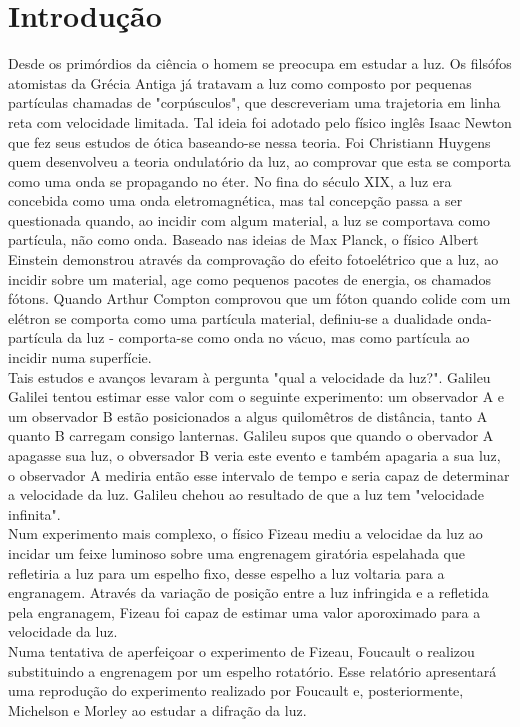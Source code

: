\section{Introdução}
Desde os primórdios da ciência o homem se preocupa em estudar a luz. Os filsófos atomistas da Grécia Antiga já tratavam a luz como composto por pequenas partículas chamadas de "corpúsculos", que descreveriam uma trajetoria em linha reta com velocidade limitada. Tal ideia foi adotado pelo físico inglês Isaac Newton que fez seus estudos de ótica baseando-se nessa teoria. Foi Christiann Huygens quem desenvolveu a teoria ondulatório da luz, ao comprovar que esta se comporta como uma onda se propagando no éter. No fina do século XIX, a luz era concebida como uma onda eletromagnética, mas tal concepção passa a ser questionada quando, ao incidir com algum material, a luz se comportava como partícula, não como onda. Baseado nas ideias de Max Planck, o físico Albert Einstein demonstrou através da comprovação do efeito fotoelétrico que a luz, ao incidir sobre um material, age como pequenos pacotes de energia, os chamados fótons. Quando Arthur Compton comprovou que um fóton quando colide com um elétron se comporta como uma partícula material, definiu-se a dualidade onda-partícula da luz - comporta-se como onda no vácuo, mas como partícula ao incidir numa superfície.\\
\indent Tais estudos e avanços levaram à pergunta "qual a velocidade da luz?". Galileu Galilei tentou estimar esse valor com o seguinte experimento: um observador A e um observador B estão posicionados a algus quilomêtros de distância, tanto A quanto B carregam consigo lanternas. Galileu supos que quando o obervador A apagasse sua luz, o obversador B veria este evento e também apagaria a sua luz, o observador A mediria então esse intervalo de tempo e seria capaz de determinar a velocidade da luz. Galileu chehou ao resultado de que a luz tem "velocidade infinita".\\
\indent Num experimento mais complexo, o físico Fizeau mediu a velocidae da luz ao incidar um feixe luminoso sobre uma engrenagem giratória espelahada que refletiria a luz para um espelho fixo, desse espelho a luz voltaria para a engranagem. Através da variação de posição entre a luz infringida e a refletida pela engranagem, Fizeau foi capaz de estimar uma valor aporoximado para a velocidade da luz.\\
Numa tentativa de aperfeiçoar o experimento de Fizeau, Foucault o realizou substituindo a engrenagem por um espelho rotatório. Esse relatório apresentará uma reprodução do experimento realizado por Foucault e, posteriormente, Michelson e Morley ao estudar a difração da luz. 
